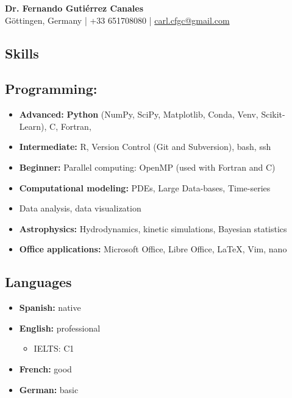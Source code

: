 \documentclass[11pt,a4paper]{article}
\begin{document}
	
	\begin{center}
		{\Huge\bfseries Dr. Fernando Guti\'errez Canales}\\[8pt]
		Göttingen, Germany | +33 651708080 | \href{mailto:carl.cfgc@gmail.com}{carl.cfgc@gmail.com}
	\end{center}
	
	\vspace{10pt}
	
	\begin{multicols}{2}
		
		\section{Skills}
		
		\subsection{Programming:}
		\begin{itemize}
			\item \textbf{Advanced:} \textbf{Python} (NumPy, SciPy, Matplotlib, Conda, Venv, Scikit-Learn), C, Fortran,
			\item \textbf{Intermediate:} R, Version Control (Git and Subversion), bash, ssh
			\item \textbf{Beginner:} Parallel computing: OpenMP (used with Fortran and C)
			\item \textbf{Computational modeling:} PDEs, Large Data-bases, Time-series
			\item Data analysis, data visualization
			\item \textbf{Astrophysics:} Hydrodynamics, kinetic simulations, Bayesian statistics
			\item \textbf{Office applications:} Microsoft Office, Libre Office, \LaTeX , Vim, nano
		\end{itemize}
		
		\subsection{Languages}
		\begin{itemize}
			\item \textbf{Spanish:} native
			\item \textbf{English:} professional
			\begin{itemize}
				\item IELTS: C1
			\end{itemize}
			\item \textbf{French:} good
			\item \textbf{German:} basic
		\end{itemize}
		

\end{multicols}
\end{document}
